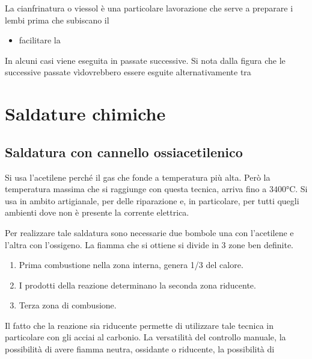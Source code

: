 La cianfrinatura o viessol è una particolare lavorazione che serve a preparare i lembi prima che subiscano il
\begin{itemize}
\item facilitare la \todo{\\aggiungi}
\end{itemize}

In alcuni casi viene eseguita in passate successive.
Si nota dalla figura  che le successive passate vìdovrebbero essere esguite alternativamente tra 

\section{Saldature chimiche}
\subsection{Saldatura con cannello ossiacetilenico}
Si usa l'acetilene perché il gas che fonde a temperatura più alta.
Però la temperatura massima che si raggiunge con questa tecnica, arriva fino a $3400\unit{\celsius}$. Si usa in ambito artigianale, per delle riparazione e, in particolare, per tutti quegli ambienti dove non è presente la corrente elettrica.

Per realizzare tale saldatura sono necessarie due bombole una con l'acetilene e l'altra con l'ossigeno.
La fiamma che si ottiene si divide in 3 zone ben definite.
\begin{enumerate}
\item Prima combustione nella zona interna, genera 1/3 del calore.
\item I prodotti della reazione determinano la seconda zona riducente.
\item Terza zona di combusione.
\end{enumerate}

Il fatto che la reazione sia riducente permette di utilizzare tale tecnica in particolare con gli acciai al carbonio.
La versatilità del controllo manuale, la possibilità di avere fiamma neutra, ossidante o riducente, la possibilità di \moretodo{\\aggiungi}


